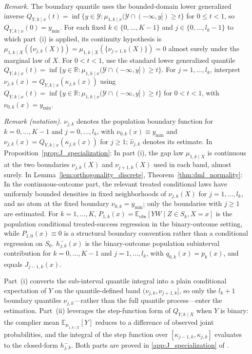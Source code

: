 \noindent\textit{Remark.} The boundary quantile uses the bounded-domain lower generalized inverse $Q_{Y,k\mid x}(t)=\inf\{y\in\mathcal Y:\mu_{1,k\mid x}(\mathcal Y\cap(-\infty,y])\geqslant t\}$ for $0\leqslant t<1$, so $Q_{Y,k\mid x}(0)=y_{\min}$. For each fixed $k\in\{0,\dots,K-1\}$ and $j\in\{0,\dots,l_k-1\}$ to which part~(i) is applied, its continuity hypothesis is $\mu_{1,k\mid X}(\{\nu_{j,k}(X)\})=\mu_{1,k\mid X}(\{\nu_{j+1,k}(X)\})=0$ almost surely under the marginal law of $X$. For $0<t<1$, use the standard lower generalized quantile $Q_{Y,k\mid x}(t)=\inf\{y\in\mathbb R:\mu_{1,k\mid x}(\mathcal Y\cap(-\infty,y])\geqslant t\}$. For $j=1,\ldots,l_k$, interpret $\nu_{j,k}(x)=Q_{Y,k\mid x}(\kappa_{j,k}(x))$ using $Q_{Y,k\mid x}(t)=\inf\{y\in\mathbb R:\mu_{1,k\mid x}(\mathcal Y\cap(-\infty,y])\geqslant t\}$ for $0<t<1$, with $\nu_{0,k}(x)=y_{\min}$.

\noindent\textit{Remark (notation).} $\nu_{j,k}$ denotes the population boundary function for $k=0,\ldots,K-1$ and $j=0,\ldots,l_k$, with $\nu_{0,k}(x)\equiv y_{\min}$ and $\nu_{j,k}(x)=Q_{Y,k\mid x}(\kappa_{j,k}(x))$ for $j\geqslant1$; $\hat\nu_{j,k}$ denotes its estimate. In Proposition~\ref{prop:J_specialization}: In part (i), the gap law $\mu_{1,k\mid X}$ is continuous at the two boundaries $\nu_{j,k}(X)$ and $\nu_{j+1,k}(X)$ used in each band, almost surely. In Lemma~\ref{lem:orthogonality_discrete}, Theorem~\ref{thm:dml_normality}: In the continuous-outcome part, the relevant treated conditional laws have uniformly bounded densities in fixed neighborhoods of $\nu_{j,k}(X)$ for $j=1,\ldots,l_k$, and no atom at the fixed boundary $\nu_{0,k}=y_{\min}$; only the boundaries with $j\geqslant1$ are estimated. For $k=1,\ldots,K$, $P_{1,k}(x)=\mathbb E_{\mathrm{obs}}[YW\mid Z\in S_k,X=x]$ is the population conditional treated-success regression in the binary-outcome setting, while $P_{1,0}(x)\equiv0$ is a structural boundary convention rather than a conditional regression on $S_0$. $h_{j,k}^{-}(x)$ is the binary-outcome population subinterval contribution for $k=0,\ldots,K-1$ and $j=1,\ldots,l_k$, with $q_{0,k}(x)=p_k(x)$, and equals $J_{j-1,k}(x)$.


Part~(i) converts the sub-interval quantile integral into a plain conditional expectation of $Y$ on the quantile-defined band $(\nu_{j,k}, \nu_{j+1,k}]$, so only the $l_k+1$ boundary quantiles $\nu_{j,k}$---rather than the full quantile process---enter the estimation. Part~(ii) leverages the step-function form of $Q_{Y,k\mid X}$ when $Y$ is binary: the complier mean $\mathbb{E}_{\mu_{1,k\mid X}}[Y]$ reduces to a difference of observed joint probabilities, and the integral of the step function over $[\kappa_{j-1,k}, \kappa_{j,k}]$ evaluates to the closed-form $h_{j,k}^{-}$. Both parts are proved in \cref{app:J_specialization} of \oalocation.

